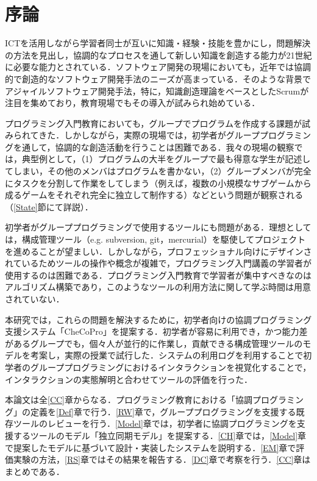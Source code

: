 \chapter{序論}
ICTを活用しながら学習者同士が互いに知識・経験・技能を豊かにし，問題解決の方法を見出し，協調的なプロセスを通して新しい知識を創造する能力が21世紀に必要な能力とされている\cite{griffin2012assessment}．ソフトウェア開発の現場においても，近年では協調的で創造的なソフトウェア開発手法のニーズが高まっている．そのような背景でアジャイルソフトウェア開発手法，特に，知識創造理論\cite{takeuchi1986new}をベースとしたScrum\cite{schwaber2002gile}が注目を集めており，教育現場でもその導入が試みられ始めている\cite{anslow2015experience}．

プログラミング入門教育においても，グループでプログラムを作成する課題が試みられてきた\cite{松浦佐江子2003}\cite{玉田春昭}．しかしながら，実際の現場では，初学者がグループプログラミングを通して，協調的な創造活動を行うことは困難である．我々の現場の観察では，典型例として，（1）プログラムの大半をグループで最も得意な学生が記述してしまい，その他のメンバはプログラムを書かない，（2）グループメンバが完全にタスクを分割して作業をしてしまう（例えば，複数の小規模なサブゲームから成るゲームをそれぞれ完全に独立して制作する）などという問題が観察される（\ref{State}節にて詳説）．

初学者がグループプログラミングで使用するツールにも問題がある．理想としては，構成管理ツール（e.g. subversion, git，mercurial）を駆使してプロジェクトを進めることが望ましい．しかしながら，プロフェッショナル向けにデザインされているためツールの操作や概念が複雑で，プログラミング入門講義の学習者が使用するのは困難である．プログラミング入門教育で学習者が集中すべきなのはアルゴリズム構築であり，このようなツールの利用方法に関して学ぶ時間は用意されていない．

本研究では，これらの問題を解決するために，初学者向けの協調プログラミング支援システム「CheCoPro」を提案する．初学者が容易に利用でき，かつ能力差があるグループでも，個々人が並行的に作業し，貢献できる構成管理ツールのモデルを考案し，実際の授業で試行した．システムの利用ログを利用することで初学者のグループプログラミングにおけるインタラクションを視覚化することで，インタラクションの実態解明と合わせてツールの評価を行った．

本論文は全\ref{CC}章からなる．プログラミング教育における「協調プログラミング」の定義を\ref{Def}章で行う．\ref{RW}章で，グループプログラミングを支援する既存ツールのレビューを行う．\ref{Model}章では，初学者に協調プログラミングを支援するツールのモデル「独立同期モデル」を提案する．\ref{CH}章では，\ref{Model}章で提案したモデルに基づいて設計・実装したシステムを説明する．\ref{EM}章で評価実験の方法，\ref{RS}章ではその結果を報告する．\ref{DC}章で考察を行う．\ref{CC}章はまとめである．